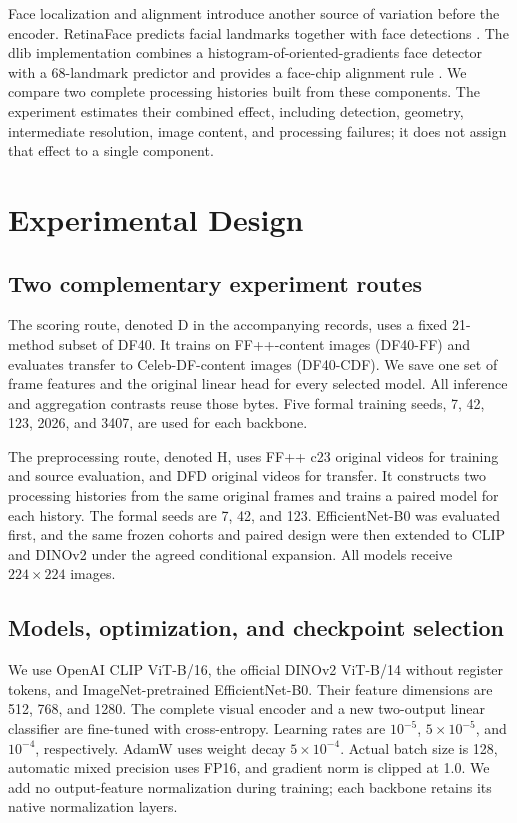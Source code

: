 \documentclass{ieeeaccess}
\begin{document}
Face localization and alignment introduce another source of variation
before the encoder. RetinaFace predicts facial landmarks together with
face detections \citep{retinaface}. The dlib implementation combines a
histogram-of-oriented-gradients face detector with a 68-landmark
predictor and provides a face-chip alignment rule \citep{dlib}. We
compare two complete processing histories built from these components.
The experiment estimates their combined effect, including detection,
geometry, intermediate resolution, image content, and processing
failures; it does not assign that effect to a single component.

\section{Experimental Design}\label{experimental-design}

\subsection{Two complementary experiment
routes}\label{two-complementary-experiment-routes}

The scoring route, denoted D in the accompanying records, uses a fixed
21-method subset of DF40. It trains on FF++-content images (DF40-FF) and
evaluates transfer to Celeb-DF-content images (DF40-CDF). We save one
set of frame features and the original linear head for every selected
model. All inference and aggregation contrasts reuse those bytes. Five
formal training seeds, 7, 42, 123, 2026, and 3407, are used for each
backbone.

The preprocessing route, denoted H, uses FF++ c23 original videos for
training and source evaluation, and DFD original videos for transfer. It
constructs two processing histories from the same original frames and
trains a paired model for each history. The formal seeds are 7, 42, and
123. EfficientNet-B0 was evaluated first, and the same frozen cohorts
and paired design were then extended to CLIP and DINOv2 under the agreed
conditional expansion. All models receive \(224\times224\) images.

\subsection{Models, optimization, and checkpoint
selection}\label{models-optimization-and-checkpoint-selection}

We use OpenAI CLIP ViT-B/16, the official DINOv2 ViT-B/14 without
register tokens, and ImageNet-pretrained EfficientNet-B0. Their feature
dimensions are 512, 768, and 1280. The complete visual encoder and a new
two-output linear classifier are fine-tuned with cross-entropy. Learning
rates are \(10^{-5}\), \(5\times10^{-5}\), and \(10^{-4}\),
respectively. AdamW uses weight decay \(5\times10^{-4}\). Actual batch
size is 128, automatic mixed precision uses FP16, and gradient norm is
clipped at 1.0. We add no output-feature normalization during training;
each backbone retains its native normalization layers.
\end{document}
